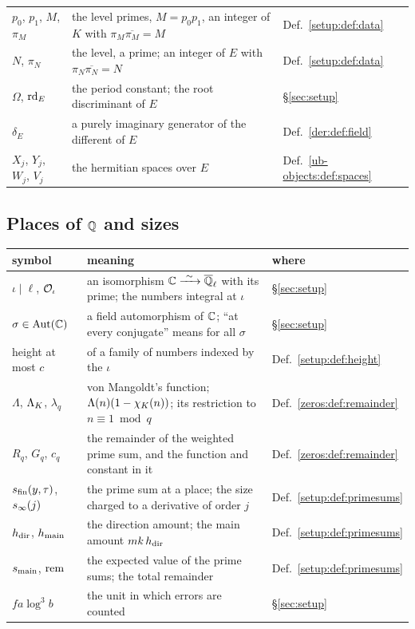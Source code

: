 \begin{center}
\begin{tabular}{@{}l p{} l@{}}
$p_0$, $p_1$, $M$, $\pi_M$ & the level primes, $M = p_0 p_1$, an integer of $K$ with $\pi_M\overline{\pi_M} = M$ & Def.~\ref{setup:def:data} \\
$N$, $\pi_N$ & the level, a prime; an integer of $E$ with $\pi_N\overline{\pi_N} = N$ & Def.~\ref{setup:def:data} \\
$\Omega$, $\mathrm{rd}_E$ & the period constant; the root discriminant of $E$ & \S\ref{sec:setup} \\
$\delta_E$ & a purely imaginary generator of the different of $E$ & Def.~\ref{der:def:field} \\
$X_j$, $Y_j$, $W_j$, $V_j$ & the hermitian spaces over $E$ & Def.~\ref{ub-objects:def:spaces} \\
\bottomrule
\end{tabular}
\end{center}

\subsection*{Places of $\mathbb{Q}$ and sizes}

\begin{center}\small
\begin{tabular}{@{}l p{} l@{}}
\toprule
symbol & meaning & where \\
\midrule
$\iota \mid \ell$, $\mathcal{O}_\iota$ & an isomorphism $\mathbb{C} \xrightarrow{\ \sim\ } \overline{\mathbb{Q}}_\ell$ with its prime; the numbers integral at $\iota$ & \S\ref{sec:setup} \\
$\sigma \in \operatorname{Aut}(\mathbb{C})$ & a field automorphism of $\mathbb{C}$; ``at every conjugate'' means for all $\sigma$ & \S\ref{sec:setup} \\
height at most $c$ & of a family of numbers indexed by the $\iota$ & Def.~\ref{setup:def:height} \\
$\Lambda$, $\Lambda_K$, $\lambda_q$ & von Mangoldt's function; $\Lambda(n)(1 - \chi_K(n))$; its restriction to $n \equiv 1 \bmod q$ & Def.~\ref{zeros:def:remainder} \\
$R_q$, $G_q$, $c_q$ & the remainder of the weighted prime sum, and the function and constant in it & Def.~\ref{zeros:def:remainder} \\
$s_{\mathrm{fin}}(y,\tau)$, $s_\infty(j)$ & the prime sum at a place; the size charged to a derivative of order $j$ & Def.~\ref{setup:def:primesums} \\
$h_{\mathrm{dir}}$, $h_{\mathrm{main}}$ & the direction amount; the main amount $m k\,h_{\mathrm{dir}}$ & Def.~\ref{setup:def:primesums} \\
$s_{\mathrm{main}}$, $\mathrm{rem}$ & the expected value of the prime sums; the total remainder & Def.~\ref{setup:def:primesums} \\
$f a\log^3 b$ & the unit in which errors are counted & \S\ref{sec:setup} \\
\bottomrule
\end{tabular}
\end{center}

